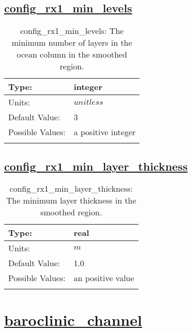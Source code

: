 \subsection[config\_rx1\_min\_levels]{\hyperref[sec:nm_tab_constrain_Haney_number]{config\_rx1\_min\_levels}}
\label{subsec:nm_sec_config_rx1_min_levels}
\begin{center}
\begin{longtable}{| p{2.0in} || p{4.0in} |}
    \hline
    Type: & integer \\
    \hline
    Units: & $unitless$ \\
    \hline
    Default Value: & 3 \\
    \hline
    Possible Values: & a positive integer \\
    \hline
    \caption{config\_rx1\_min\_levels: The minimum number of layers in the ocean column in the smoothed region.}
\end{longtable}
\end{center}
\subsection[config\_rx1\_min\_layer\_thickness]{\hyperref[sec:nm_tab_constrain_Haney_number]{config\_rx1\_min\_layer\_thickness}}
\label{subsec:nm_sec_config_rx1_min_layer_thickness}
\begin{center}
\begin{longtable}{| p{2.0in} || p{4.0in} |}
    \hline
    Type: & real \\
    \hline
    Units: & $m$ \\
    \hline
    Default Value: & 1.0 \\
    \hline
    Possible Values: & an positive value \\
    \hline
    \caption{config\_rx1\_min\_layer\_thickness: The minimum layer thickness in the smoothed region.}
\end{longtable}
\end{center}
\section[baroclinic\_channel]{\hyperref[sec:nm_tab_baroclinic_channel]{baroclinic\_channel}}
\label{sec:nm_sec_baroclinic_channel}
